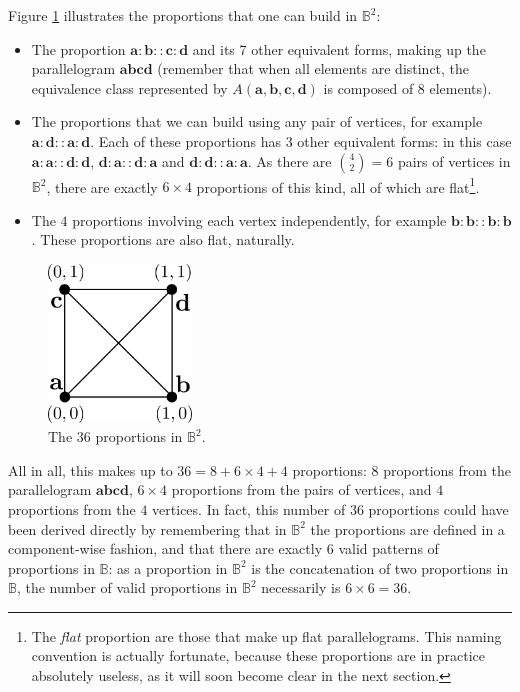 Figure \ref{FIG:proportions_in_B2} illustrates the proportions that
one can build in $\mathbb{B}^2$:
\begin{itemize}
  \item The proportion $\mathbf{a}: \mathbf{b} :: \mathbf{c} : \mathbf{d}$ and
    its 7 other equivalent forms, making up the parallelogram
    $\mathbf{a}\mathbf{b}\mathbf{c}\mathbf{d}$ (remember that when all elements
    are distinct, the equivalence class represented by $A(\mathbf{a},
    \mathbf{b}, \mathbf{c}, \mathbf{d})$ is composed of $8$ elements).
  \item The proportions that we can build using any pair of vertices, for
    example $\mathbf{a} : \mathbf{d} :: \mathbf{a} : \mathbf{d}$. Each of these
    proportions has $3$ other equivalent forms: in this case $\mathbf{a} :
    \mathbf{a} :: \mathbf{d} : \mathbf{d}$, $\mathbf{d} : \mathbf{a} ::
    \mathbf{d} : \mathbf{a}$ and $\mathbf{d} : \mathbf{d} :: \mathbf{a} :
    \mathbf{a}$. As there are $\binom{4}{2} = 6$ pairs of vertices in
    $\mathbb{B}^2$, there are exactly $6 \times 4$ proportions of this kind,
    all of which are flat\footnote{The \textit{flat} proportion are those that make
    up flat parallelograms. This naming convention is actually fortunate,
    because these proportions are in practice absolutely useless, as it will
    soon become clear in the next section.}.
  \item The $4$ proportions involving each vertex independently, for example
    $\mathbf{b}:\mathbf{b}::\mathbf{b}:\mathbf{b}$. These proportions are also
    flat, naturally.
\end{itemize}

\begin{figure}[!h]
\centering
\includegraphics[width=1.5in]{figures/proportions_in_B2.pdf}
  \caption{The $36$ proportions in $\mathbb{B}^2$.}
\label{FIG:proportions_in_B2}
\end{figure}

All in all, this makes up to $36 = 8 + 6 \times 4 + 4$ proportions: $8$
proportions from the parallelogram $\mathbf{a}\mathbf{b}\mathbf{c}\mathbf{d}$,
$6 \times 4$ proportions from the pairs of vertices, and $4$ proportions from the
$4$ vertices. In fact, this number of $36$ proportions could have been derived
directly by remembering that in $\mathbb{B}^2$ the proportions are defined in a
component-wise fashion, and that there are exactly $6$ valid patterns of
proportions in $\mathbb{B}$: as a proportion in $\mathbb{B}^2$ is the
concatenation of two proportions in $\mathbb{B}$, the number of valid
proportions in $\mathbb{B}^2$ necessarily is $6 \times 6 = 36$.

